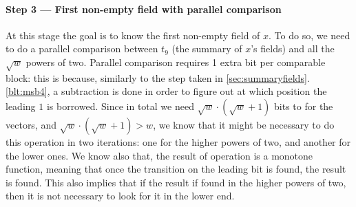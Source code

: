 \paragraph{Step 3 --- First non-empty field with parallel comparison} \label{sec:parallel}
At this stage the goal is to know the first non-empty field of $x$. To do so, we need to do a parallel comparison between $t_9$ (the summary of $x$'s fields) and all the $\sqrt{w}$ powers of two. Parallel comparison requires 1 extra bit per comparable block: this is because, similarly to the step taken in \ref{sec:summaryfields}.\ref{blt:msb4}, a subtraction is done in order to figure out at which position the leading $1$ is borrowed. Since in total we need $\sqrt{w}\cdot(\sqrt{w} + 1)$ bits to for the vectors, and $\sqrt{w}\cdot(\sqrt{w} + 1) > w$, we know that it might be necessary to do this operation in two iterations: one for the higher powers of two, and another for the lower ones. We know also that, the result of operation is a monotone function, meaning that once the transition on the leading bit is found, the result is found. This also implies that if the result if found in the higher powers of two, then it is not necessary to look for it in the lower end.

